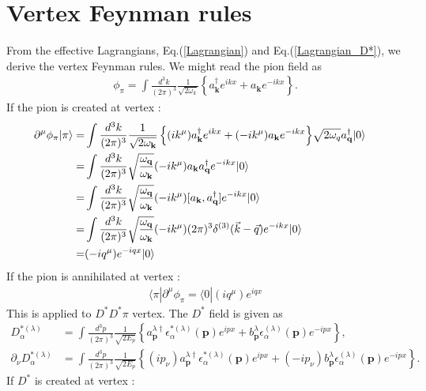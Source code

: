 \documentclass[aps,prd,preprintnumbers,showpacs,showkeys,nofootinbib,
superscriptaddress,fleqn,floatfix,tightenlines, 10pt]{revtex4-1}
\begin{document}
\section{Vertex Feynman rules}
From the effective Lagrangians, Eq.(\ref{Lagrangian}) and Eq.(\ref{Lagrangian_D*}), we derive the vertex Feynman rules. We might read the pion field as
\begin{align*}
	\phi_\pi = \int{\frac{d^3 k}{(2\pi)^3}
	\frac{1}{\sqrt{2 \omega_k}}\left\{a_\mathbf{k}^\dagger e^{ik x} + a_\mathbf{k} e^{-ikx}\right\}}.
\end{align*}
If the pion is created at vertex :
\begin{align*}
	\partial^\mu \phi_\pi | \pi \rangle = &\int{\frac{d^3 k}{(2\pi)^3}
	\frac{1}{\sqrt{2\omega_\mathbf{k}}}\left\{(ik^\mu)a_\mathbf{k}^\dagger e^{ik x} + (-ik^\mu)a_\mathbf{k} e^{-ikx}\right\}} \sqrt{2\omega_q}
	a_\mathbf{q}^\dagger|0\rangle \cr
	=&\int{\frac{d^3 k}{(2\pi)^3}
	\sqrt{\frac{\omega_\mathbf{q}}{\omega_\mathbf{k}}}(-ik^\mu) a_\mathbf{k}  a_\mathbf{q}^\dagger e^{-ikx}}|0\rangle \cr
	=& \int{\frac{d^3 k}{(2\pi)^3}
	\sqrt{\frac{\omega_\mathbf{q}}{\omega_\mathbf{k}}} (-ik^\mu)[a_\mathbf{k},  a_\mathbf{q}^\dagger] e^{-ikx}}|0\rangle \cr
	=& \int{\frac{d^3 k}{(2\pi)^3}
	\sqrt{\frac{\omega_\mathbf{q}}{\omega_\mathbf{k}}}(-ik^\mu) (2\pi)^3 \delta^{(3)} (\vec{k} - \vec{q}) e^{-ikx}}|0\rangle \cr
	=&(-iq^\mu) e^{-iqx} |0\rangle
\end{align*}
If the pion is annihilated at vertex :
\begin{align*}
	\langle \pi | \partial^\mu \phi_\pi = \langle 0| (iq^\mu) e^{iqx}
\end{align*}
This is applied to $D^*D^*\pi$ vertex. The $D^*$ field is given as
\begin{align*}
	D_\alpha^{*(\lambda)} &= \int{\frac{d^3 p}{(2\pi)^3}
	\frac{1}{\sqrt{2 E_p}}\left\{ a_\mathbf{p}^{\lambda \dagger} \epsilon_\alpha^{*(\lambda)}(\mathbf{p})e^{ipx}
	+ b_\mathbf{p}^\lambda \epsilon_\alpha^{(\lambda)}(\mathbf{p}) e^{-ipx}  \right\}},\\
	\partial_\nu D_\alpha^{*(\lambda)} &= \int{\frac{d^3 p}{(2\pi)^3}
	\frac{1}{\sqrt{2 E_p}}\left\{ (ip_\nu) a_\mathbf{p}^{\lambda \dagger} \epsilon_\alpha^{*(\lambda)}(\mathbf{p})e^{ipx}
	+ (-ip_\nu)b_\mathbf{p}^\lambda \epsilon_\alpha^{(\lambda)}(\mathbf{p}) e^{-ipx}  \right\}}.
\end{align*}
If $D^*$ is created at vertex :
\end{document}
